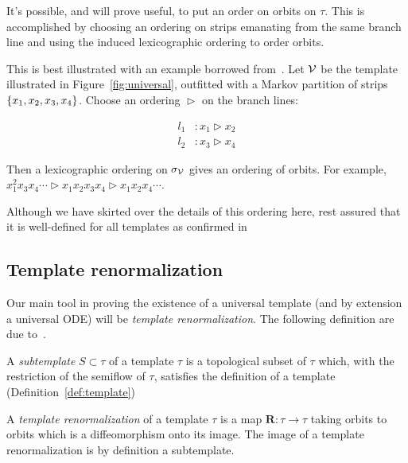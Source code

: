 \documentclass[paper.tex]{subfiles}
\begin{document}
It's possible, and will prove useful, to put an order on orbits on $\tau$. This is accomplished by choosing an ordering on strips emanating from the same branch line and using the induced lexicographic ordering to
order orbits.

This is best illustrated with an example borrowed from~\cite{knottyode}. Let $\mathcal{V}$ be the template illustrated in Figure~\ref{fig:universal}, outfitted with a Markov partition of strips $\{ x_1, x_2, x_3, x_4 \}$.
Choose an ordering $\vartriangleright$ on the branch lines:

\begin{align}
  l_1 &: x_1 \vartriangleright x_2 \\
  l_2 &: x_3 \vartriangleright x_4
\end{align}

Then a lexicographic ordering on $\sigma_{\mathcal{V}}$ gives an ordering of orbits. For example, $x_1^2 x_3 x_4 \cdots \vartriangleright x_1 x_2 x_3 x_4 \vartriangleright x_1 x_2 x_4 \cdots$.

Although we have skirted over the details of this ordering here, rest assured that it is well-defined for all templates as confirmed in~\cite{Holmes1989}\cite{Holmes1985}\cite{knottyode}


\subsection{Template renormalization}

Our main tool in proving the existence of a universal template (and by extension a universal ODE) will be \emph{template renormalization}. The following definition are due to~\cite{knottyode}.


\begin{definition}[Subtemplate]
  A \emph{subtemplate} $S \subset \tau$ of a template $\tau$ is a topological subset of $\tau$ which, with the restriction of the semiflow of $\tau$, satisfies the definition of a template (Definition~\ref{def:template})
\end{definition}


\begin{definition}
  A  \emph{template renormalization} of a template $\tau$ is a map $\bm{R} : \tau \to \tau$ taking orbits to orbits which is a diffeomorphism onto its image.
  The image of a template renormalization is by definition a subtemplate.
\end{definition}
\end{document}
